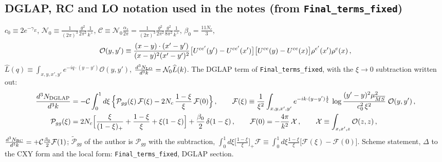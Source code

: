 {\color{red}
\subsection*{DGLAP, RC and LO notation used in the notes (from \texttt{Final\_terms\_fixed})}
 $c_{0}\equiv2e^{-\gamma_{E}}$, $\mathcal{N}_{0}\equiv\frac{1}{(2\pi)^{3}}\frac{g^{2}}{2\pi^{2}}\frac{1}{k^{+}}$, $\mathcal{C}\equiv\mathcal{N}_{0}\frac{\alpha_{s}}{2\pi}=\frac{1}{(2\pi)^{3}}\frac{g^{2}}{2\pi^{2}}\frac{g^{2}}{8\pi^{2}}\frac{1}{k^{+}}$, $\beta_{0}=\frac{11N_{c}}{3}$, \begin{align}\mathcal{O}(y,y')\equiv\frac{(x-y)\cdot(x'-y')}{(x-y)^{2}(x'-y')^{2}}\big[U^{ce'}(y')-U^{ce'}(x')\big]\big[U^{ce}(y)-U^{ce}(x)\big]\rho^{e'}(x')\rho^{e}(x)\,,\notag\end{align}$\widehat{L}(q)\equiv\int_{x,y,x',y'}e^{-iq\cdot(y-y')}\mathcal{O}(y,y')$, $\frac{d^{3}N_{\rm LO}}{d^{3}k}=\mathcal{N}_{0}\widehat{L}(k)$. The DGLAP term of \texttt{Final\_terms\_fixed}, with the $\xi\to0$ subtraction written out:
\begin{align}
\frac{d^{3}N_{\rm DGLAP}}{d^{3}k}&=-\mathcal{C}\int_{0}^{1}d\xi\,\Big\{\mathcal{P}_{gg}(\xi)\,\mathcal{F}(\xi)-2N_{c}\,\frac{1-\xi}{\xi}\,\mathcal{F}(0)\Big\}\,,\qquad
\mathcal{F}(\xi)\equiv\frac{1}{\xi^{2}}\int_{x,y,x',y'}e^{-ik\cdot(y-y')\frac{1}{\xi}}\,\log\frac{(y'-y)^{2}\mu^{2}_{\overline{MS}}}{c_{0}^{2}\,\xi^{2}}\;\mathcal{O}(y,y')\,,\notag\\
\mathcal{P}_{gg}(\xi)&=2N_{c}\Big[\frac{\xi}{(1-\xi)_{+}}+\frac{1-\xi}{\xi}+\xi(1-\xi)\Big]+\frac{\beta_{0}}{2}\,\delta(1-\xi)\,,\qquad
\mathcal{F}(0)=-\frac{4\pi}{k^{2}}\,\mathcal{X}\,,\qquad\mathcal{X}\equiv\int_{x,x',z}\mathcal{O}(z,z)\,,\label{eq:fx-DGLAP}
\end{align}
$\frac{d^{3}N_{\rm RC}}{d^{3}k}=+\mathcal{C}\frac{\beta_{0}}{2}\mathcal{F}(1)$; $\widetilde{\mathcal{P}}_{gg}$ of the author is $\mathcal{P}_{gg}$ with the subtraction, $\int_{0}^{1}d\xi\big[\frac{1-\xi}{\xi}\big]_{+}\mathcal{F}\equiv\int_{0}^{1}d\xi\frac{1-\xi}{\xi}\big[\mathcal{F}(\xi)-\mathcal{F}(0)\big]$. Scheme statement, $\Delta$ to the CXY form and the local form: \texttt{Final\_terms\_fixed}, DGLAP section.}\par
